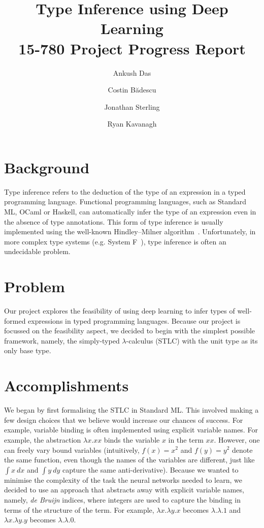 \documentclass{amsart}
\title{Type Inference using Deep Learning\\15-780 Project Progress Report}
\author{Ankush Das}
\author{Costin B\u{a}descu}
\author{Jonathan Sterling}
\author{Ryan Kavanagh}
\begin{document}
\maketitle

\section{Background}
Type inference refers to the deduction of the type of an expression in a
typed programming language. Functional programming
languages, such as Standard ML, OCaml or Haskell, can automatically infer the
type of an expression even in the absence of type annotations.  This
form of type inference is usually implemented using the well-known
Hindley--Milner algorithm~\cite{hindley1969principal, milner1978theory}.
Unfortunately, in more complex type systems (e.g. System
F~\cite{wells1999typability}), type inference is often an undecidable
problem.

\section{Problem}
Our project explores the feasibility of using deep learning to infer
types of well-formed expressions in typed programming
languages. Because our project is focussed on the feasibility aspect,
we decided to begin with the simplest possible framework, namely, the
simply-typed $\lambda$-calculus (STLC) with the unit type as its only
base type.

\section{Accomplishments}

We began by first formalising the STLC in Standard ML. This involved
making a few design choices that we believe would increase our chances
of success. For example, variable binding is often implemented using
explicit variable names. For example, the abstraction $\lambda x. xx$
binds the variable $x$ in the term $xx$. However, one can freely vary
bound variables (intuitively, $f(x) = x^2$ and $f(y) = y^2$ denote the
same function, even though the names of the variables are different,
just like $\int x\ dx$ and $\int y\ dy$ capture the same
anti-derivative). Because we wanted to minimise the complexity of the
task the neural networks needed to learn, we decided to use an
approach that abstracts away with explicit variable names, namely,
\textit{de Bruijn} indices, where integers are used to capture the
binding in terms of the structure of the term. For example,
$\lambda x.\lambda y.x$ becomes $\lambda.\lambda.1$ and
$\lambda x.\lambda y.y$ becomes $\lambda . \lambda . 0$.
\end{document}
